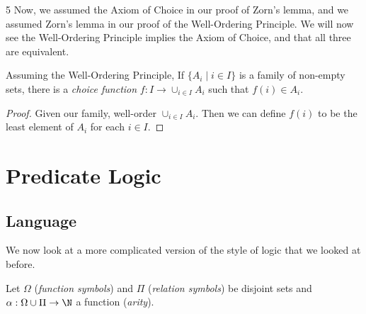 \documentclass[a3paper, 10pt]{article}
\renewcommand{\vocab}[1]{\emph{#1}}
\begin{document}
\begin{multicols*}{5}
Now, we assumed the Axiom of Choice in our proof of Zorn's lemma, and we assumed Zorn's lemma in our proof of the Well-Ordering Principle. We will now see the Well-Ordering Principle implies the Axiom of Choice, and that all three are equivalent.

\begin{theorem}
  Assuming the Well-Ordering Principle, 
  If $\{A_i \mid i \in I\}$ is a family of non-empty sets, there is a \vocab{choice function} $f: I \rightarrow \cup_{i \in I} A_i$ such that $f(i) \in A_i$.
\end{theorem}
\begin{proof}
  Given our family, well-order $\cup_{i \in I} A_i$. Then we can define $f(i)$ to be the least element of $A_i$ for each $i \in I$.
\end{proof}


\section{Predicate Logic}

\subsection{Language}

We now look at a more complicated version of the style of logic that we looked at before.

\begin{definition}[Language]
  Let $\Omega$ (\vocab{function symbols}) and $\Pi$ (\vocab{relation symbols}) be disjoint sets and $\alpha: \Omega \cup \Pi \rightarrow \N$ a function (\vocab{arity}).


\end{definition}
\end{multicols*}
\end{document}
